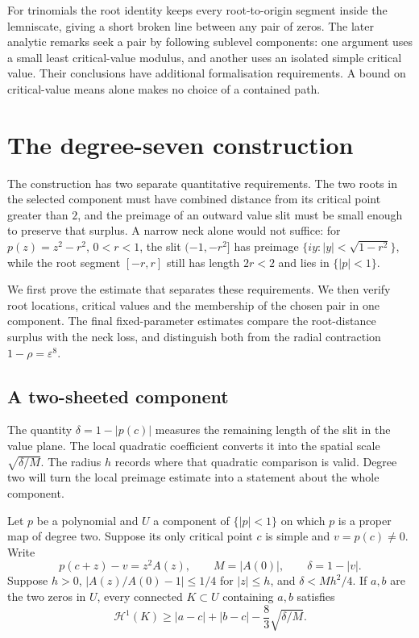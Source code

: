 \documentclass[11pt]{article}
\begin{document}
For trinomials the root identity keeps every root-to-origin segment
inside the lemniscate, giving a short broken line between any pair of
zeros. The later analytic remarks seek a pair by following sublevel
components: one argument uses a small least critical-value modulus,
and another uses an isolated simple critical value. Their conclusions
have additional formalisation requirements. A bound on critical-value
means alone makes no choice of a contained path.

\section{The degree-seven construction}\label{sec:counterexample-proof}

The construction has two separate quantitative requirements. The two
roots in the selected component must have combined distance from its
critical point greater than $2$, and the preimage of an outward value
slit must be small enough to preserve that surplus. A narrow neck alone
would not suffice: for $p(z)=z^2-r^2$, $0<r<1$, the slit
$(-1,-r^2]$ has preimage $\{iy:|y|<\sqrt{1-r^2}\}$, while the root
segment $[-r,r]$ still has length $2r<2$ and lies in $\{|p|<1\}$.

We first prove the estimate that separates these requirements. We then
verify root locations, critical values and the membership of the chosen
pair in one component. The final fixed-parameter estimates compare the root-distance
surplus with the neck loss, and distinguish both from the radial
contraction $1-\rho=\varepsilon^8$.

\subsection{A two-sheeted component}\label{subsec:two-sheet-bottleneck}

The quantity $\delta=1-|p(c)|$ measures the remaining length of the
slit in the value plane. The local quadratic coefficient converts it
into the spatial scale $\sqrt{\delta/M}$. The radius $h$ records where
that quadratic comparison is valid. Degree two will turn the local
preimage estimate into a statement about the whole component.

\begin{lemma}\label{lem:two-sheet-bottleneck-long}
Let $p$ be a polynomial and $U$ a component of $\{|p|<1\}$ on which $p$
is a proper map of degree two. Suppose its only critical point $c$ is
simple and $v=p(c)\ne0$.
Write
\[
 p(c+z)-v=z^2 A(z),\qquad M=|A(0)|,\qquad \delta=1-|v|.
\]
Suppose $h>0$, $|A(z)/A(0)-1|\le1/4$ for $|z|\le h$, and
$\delta<Mh^2/4$. If $a,b$ are the two zeros in $U$, every connected
$K\subset U$ containing $a,b$ satisfies
\[
 \mathcal H^1(K)\ge |a-c|+|b-c|-\frac83\sqrt{\delta/M}.
\]
\end{lemma}
\end{document}
